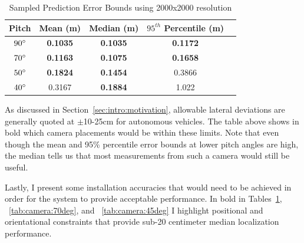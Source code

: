 \documentclass[a4paper,12pt,twoside,openright]{report}
\begin{document}
\begin{table}[htb]
    \centering
    \caption{Sampled Prediction Error Bounds using 2000x2000 resolution}
    \label{tab:camera:best error bounds}
    \begin{tabular}{@{}ccccc@{}}
        \toprule 
        \textbf{Pitch}       & \textbf{Mean (m)}   & \textbf{Median (m)} & \textbf{$95^{th}$ Percentile (m)} &  \\ \midrule 
        $90\degree$ & \textbf{0.1035} & \textbf{0.1035} & \textbf{0.1172}           &  \\ 
        $70\degree$ & \textbf{0.1163} & \textbf{0.1075} & \textbf{0.1658}           &  \\
        $50\degree$ & \textbf{0.1824} & \textbf{0.1454} & 0.3866           &  \\
        $40\degree$ & 0.3167 & \textbf{0.1884} & 1.022            &  \\ \midrule
    \end{tabular}
\end{table}


As discussed in Section~\ref{sec:intro:motivation}, allowable lateral deviations are generally
quoted at $\pm$10-25cm for autonomous vehicles. The table above shows in bold which camera placements would be 
within these limits. Note that even though the mean and 95\% percentile error bounds
at lower pitch angles are high, the median tells us that most measurements
from such a camera would still be useful.

Lastly, I present some installation accuracies that would need to be achieved
in order for the system to provide acceptable performance. In bold in 
Tables~\ref{tab:camera:best error bounds}, ~\ref{tab:camera:70deg}, and
~\ref{tab:camera:45deg} I highlight positional and orientational 
constraints that provide sub-20 centimeter median localization performance.
\end{document}
